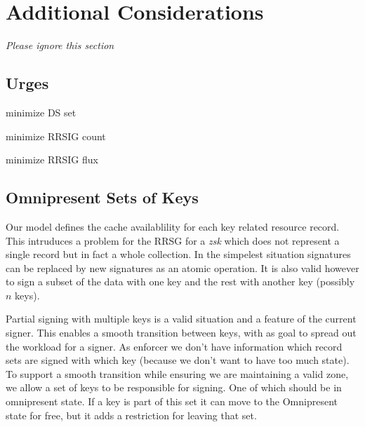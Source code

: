 \documentclass[twoside,english, a4paper]{article}
\begin{document}
\section{Additional Considerations}

\emph{Please ignore this section}




\subsection{Urges}

minimize DS set

minimize RRSIG count

minimize RRSIG flux


\subsection{Omnipresent Sets of Keys}
\label{redifined-propagated}

Our model defines the cache availablility for each key related resource
record. This intruduces a problem for the RRSG for a \emph{zsk} which
does not represent a single record but in fact a whole collection. 
In the simpelest situation signatures can be replaced by new signatures 
as an atomic operation. It is also valid however to sign a subset of
the data with one key and the rest with another key (possibly $n$ keys).

Partial signing with multiple keys is a valid situation and a 
feature of the current signer. This enables a smooth transition 
between keys, with as goal to spread out the workload for a signer. 
As enforcer we don't have information which record sets are signed 
with which key (because we don't want to have too much state). To 
support a smooth transition while ensuring we are maintaining a 
valid zone, we allow a set of keys to be 
responsible for signing. One of which should be in omnipresent state.
If a key is part of this set it can move to the Omnipresent state for 
free, but it adds a restriction for leaving that set.
\end{document}
